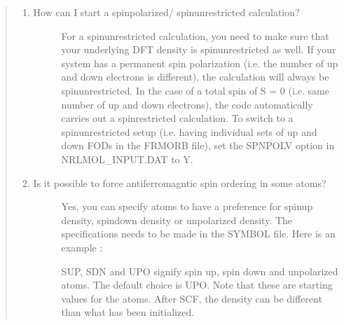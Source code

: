 \documentclass[letterpaper,10pt,english,openany,oneside]{sphinxmanual}
\begin{document}
\begin{quote}
\begin{enumerate}
\item {} \begin{description}
\item[{How can I start a spin\sphinxhyphen{}polarized/ spin\sphinxhyphen{}unrestricted calculation?}] \leavevmode
\sphinxAtStartPar
For a spin\sphinxhyphen{}unrestricted calculation, you need to make sure that your underlying DFT density is spin\sphinxhyphen{}unrestricted as well.
If your system has a permanent spin polarization (i.e. the number of up and down electrons is different), the calculation
will always be spin\sphinxhyphen{}unrestricted.
In the case of a total spin of S = 0 (i.e. same number of up and down electrons), the code automatically carries out
a spin\sphinxhyphen{}restricted calculation. To switch to a spin\sphinxhyphen{}unrestricted setup (i.e. having individual sets of up and down FODs in the FRMORB file), set the
SPNPOLV option in NRLMOL\_INPUT.DAT to Y.

\end{description}

\item {} \begin{description}
\item[{Is it possible to force antiferromagntic spin ordering in some atoms?}] \leavevmode
\sphinxAtStartPar
Yes, you can specify atoms to have a preference for spin\sphinxhyphen{}up density, spin\sphinxhyphen{}down density or unpolarized density. The specifications needs to be made in the SYMBOL file. Here is an example :


\sphinxAtStartPar
SUP, SDN and UPO signify spin up, spin down and unpolarized atoms. The default choice is UPO.
Note that these are starting values for the atoms. After SCF, the density can be different than what has been initialized.

\end{description}

\end{enumerate}
\end{quote}



\renewcommand{\indexname}{Index}
\printindex
\end{document}

